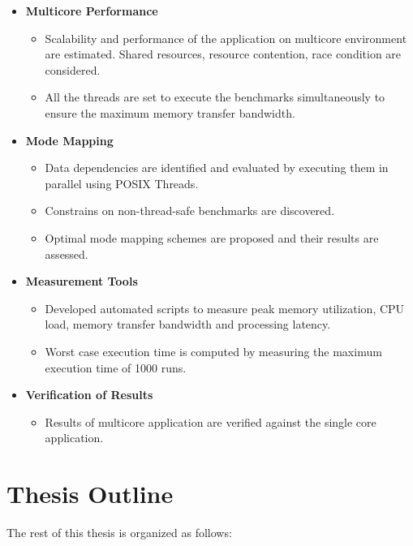 \begin{itemize}
\item{\bf Multicore Performance}
  \begin{itemize}
    \item Scalability and performance of the application on multicore environment are estimated. Shared resources, resource contention, race condition are considered.
    \item All the threads are set to execute the benchmarks simultaneously to ensure the maximum memory transfer bandwidth.
  \end{itemize}
\item {\bf Mode Mapping}
 	\begin{itemize}
 	\item Data dependencies are identified and evaluated by executing them in parallel using POSIX Threads.
   	\item Constrains on non-thread-safe benchmarks are discovered.
   	\item Optimal mode mapping schemes are proposed and their results are assessed.
	\end{itemize}
\item {\bf Measurement Tools}
  \begin{itemize}
      \item Developed automated scripts to measure peak memory utilization, CPU load, memory transfer bandwidth and processing latency.
      \item Worst case execution time is computed by measuring the maximum execution time of 1000 runs.
  \end{itemize}
 \item {\bf Verification of Results}
   \begin{itemize}
       \item Results of multicore application are verified against the single core application.
   \end{itemize}
\end{itemize}

\section{Thesis Outline}
\label{sec:intro:outline}

The rest of this thesis is organized as follows:

